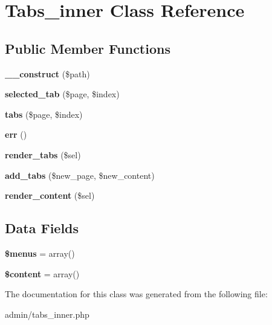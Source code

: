 \hypertarget{class_tabs__inner}{}\section{Tabs\+\_\+inner Class Reference}
\label{class_tabs__inner}
\subsection*{Public Member Functions}
\begin{DoxyCompactItemize}
\item 
\hypertarget{class_tabs__inner_a03853ceaa393e487835b287de58aba5a}{}{\bfseries \+\_\+\+\_\+construct} (\$path)\label{class_tabs__inner_a03853ceaa393e487835b287de58aba5a}

\item 
\hypertarget{class_tabs__inner_a03a3c5bc8af0ae1ebbac0efcdd98e6ae}{}{\bfseries selected\+\_\+tab} (\$page, \$index)\label{class_tabs__inner_a03a3c5bc8af0ae1ebbac0efcdd98e6ae}

\item 
\hypertarget{class_tabs__inner_ac14a3201b26c45d640fac60c0d840ff8}{}{\bfseries tabs} (\$page, \$index)\label{class_tabs__inner_ac14a3201b26c45d640fac60c0d840ff8}

\item 
\hypertarget{class_tabs__inner_aa5da7dbb221d92319dd6830c9ca98b00}{}{\bfseries err} ()\label{class_tabs__inner_aa5da7dbb221d92319dd6830c9ca98b00}

\item 
\hypertarget{class_tabs__inner_adae49c3f11ac1991d6913d2ef1766f05}{}{\bfseries render\+\_\+tabs} (\$sel)\label{class_tabs__inner_adae49c3f11ac1991d6913d2ef1766f05}

\item 
\hypertarget{class_tabs__inner_a06bc1d223f7380016b437769668916b8}{}{\bfseries add\+\_\+tabs} (\$new\+\_\+page, \$new\+\_\+content)\label{class_tabs__inner_a06bc1d223f7380016b437769668916b8}

\item 
\hypertarget{class_tabs__inner_a6c5cd4b52a9da7da6bdc7ad5ae4e5868}{}{\bfseries render\+\_\+content} (\$sel)\label{class_tabs__inner_a6c5cd4b52a9da7da6bdc7ad5ae4e5868}

\end{DoxyCompactItemize}
\subsection*{Data Fields}
\begin{DoxyCompactItemize}
\item 
\hypertarget{class_tabs__inner_a681cf86fb2440a8c89c88603a08670ba}{}{\bfseries \$menus} = array()\label{class_tabs__inner_a681cf86fb2440a8c89c88603a08670ba}

\item 
\hypertarget{class_tabs__inner_a57b284fe00866494b33afa80ba729bed}{}{\bfseries \$content} = array()\label{class_tabs__inner_a57b284fe00866494b33afa80ba729bed}

\end{DoxyCompactItemize}


The documentation for this class was generated from the following file\+:\begin{DoxyCompactItemize}
\item 
admin/tabs\+\_\+inner.\+php\end{DoxyCompactItemize}
